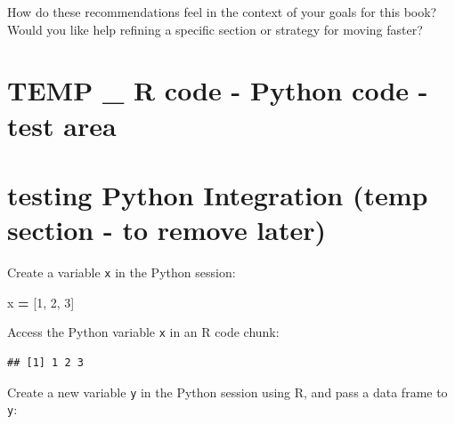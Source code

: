 \documentclass[
  12 pt,
  a4paper,
]{book}
\newenvironment{Shaded}{\begin{snugshade}}{\end{snugshade}}
\newcommand{\DecValTok}[1]{\textcolor[rgb]{0.00,0.00,0.81}{#1}}
\newcommand{\FunctionTok}[1]{\textcolor[rgb]{0.13,0.29,0.53}{\textbf{#1}}}
\newcommand{\NormalTok}[1]{#1}
\newcommand{\OperatorTok}[1]{\textcolor[rgb]{0.81,0.36,0.00}{\textbf{#1}}}
\newcommand{\OtherTok}[1]{\textcolor[rgb]{0.56,0.35,0.01}{#1}}
\newcommand{\SpecialCharTok}[1]{\textcolor[rgb]{0.81,0.36,0.00}{\textbf{#1}}}
\numberwithin{equation}{section}
\theoremstyle{plain}      %
\theoremstyle{definition} %
\theoremstyle{remark}     %
\theoremstyle{note}         %
\begin{document}
How do these recommendations feel in the context of your goals for this
book? Would you like help refining a specific section or strategy for
moving faster?

\newpage

\hypertarget{temp-_-r-code---python-code---test-area}{%
\section{TEMP \_ R code - Python code - test
area}\label{temp-_-r-code---python-code---test-area}}

\hypertarget{testing-python-integration-temp-section---to-remove-later}{%
\section{testing Python Integration (temp section - to remove
later)}\label{testing-python-integration-temp-section---to-remove-later}}

Create a variable \texttt{x} in the Python session:

\begin{Shaded}
\begin{Highlighting}[]
\NormalTok{x }\OperatorTok{=}\NormalTok{ [}\DecValTok{1}\NormalTok{, }\DecValTok{2}\NormalTok{, }\DecValTok{3}\NormalTok{]}
\end{Highlighting}
\end{Shaded}

Access the Python variable \texttt{x} in an R code chunk:

\begin{Shaded}
\end{Shaded}

\begin{verbatim}
## [1] 1 2 3
\end{verbatim}

Create a new variable \texttt{y} in the Python session using R, and pass
a data frame to \texttt{y}:

\begin{Shaded}
\end{Shaded}
\end{document}
